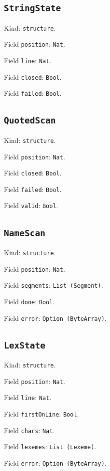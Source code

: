 \documentclass[11pt]{article}
\begin{document}
\subsection*{\texttt{StringState}}
\noindent Kind: \texttt{structure}.\par
\noindent Field \texttt{position}: \texttt{Nat}.\par
\noindent Field \texttt{line}: \texttt{Nat}.\par
\noindent Field \texttt{closed}: \texttt{Bool}.\par
\noindent Field \texttt{failed}: \texttt{Bool}.\par
\subsection*{\texttt{QuotedScan}}
\noindent Kind: \texttt{structure}.\par
\noindent Field \texttt{position}: \texttt{Nat}.\par
\noindent Field \texttt{closed}: \texttt{Bool}.\par
\noindent Field \texttt{failed}: \texttt{Bool}.\par
\noindent Field \texttt{valid}: \texttt{Bool}.\par
\subsection*{\texttt{NameScan}}
\noindent Kind: \texttt{structure}.\par
\noindent Field \texttt{position}: \texttt{Nat}.\par
\noindent Field \texttt{segments}: \texttt{List (Segment)}.\par
\noindent Field \texttt{done}: \texttt{Bool}.\par
\noindent Field \texttt{error}: \texttt{Option (ByteArray)}.\par
\subsection*{\texttt{LexState}}
\noindent Kind: \texttt{structure}.\par
\noindent Field \texttt{position}: \texttt{Nat}.\par
\noindent Field \texttt{line}: \texttt{Nat}.\par
\noindent Field \texttt{firstOnLine}: \texttt{Bool}.\par
\noindent Field \texttt{chars}: \texttt{Nat}.\par
\noindent Field \texttt{lexemes}: \texttt{List (Lexeme)}.\par
\noindent Field \texttt{error}: \texttt{Option (ByteArray)}.\par
\end{document}
